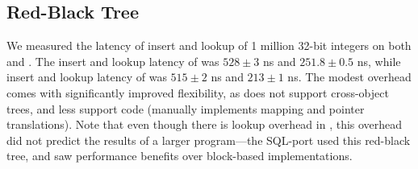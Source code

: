 {    \subsection{Red-Black Tree} We measured the latency of insert and lookup of 1 million 32-bit
    integers on both \unixrbt and \nvrbt. The insert and lookup latency of \nvrbt was $528 \pm 3$ ns
    and $251.8 \pm 0.5$ ns, while insert and lookup latency of \unixrbt was $515 \pm 2$ ns
    and $213 \pm 1$ ns.
    The modest overhead comes with significantly improved flexibility, as \unixrbt does not support
    cross-object trees, and less support code (\unixrbt manually implements mapping and pointer
    translations). Note that even though there is lookup overhead in
    \nvrbt, this overhead did not predict the results of a larger program---the SQL-\Twizzler port used
    this red-black tree, and saw performance benefits over block-based implementations.

}